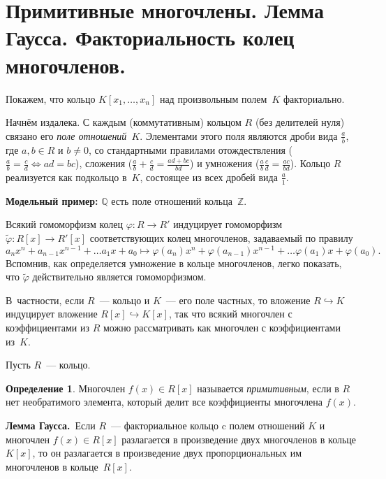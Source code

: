 \documentclass[a4paper, 12pt]{article}
\def\ZZ{{\mathbb Z}}%
\def\QQ{{\mathbb Q}}%
\theoremstyle{definition}
\newtheorem{definition}{Определение}
\theoremstyle{remark}
\begin{document}
\section*{Примитивные многочлены. Лемма Гаусса. Факториальность колец многочленов.}

Покажем, что кольцо $K[x_1, \ldots, x_n]$ над
произвольным полем~$K$ факториально.

Начнём издалека. С каждым (коммутативным) кольцом $R$ (без делителей
нуля) связано его \textit{поле отношений}~$K$. Элементами этого поля
являются дроби вида $\frac{a}{b}$, где $a,b \in R$ и $b\ne 0$, со
стандартными правилами отождествления ($\frac{a}{b} = \frac{c}{d}
\Leftrightarrow ad = bc$), сложения ($\frac{a}{b} + \frac{c}{d} =
\frac{ad+bc}{bd}$) и умножения ($\frac{a}{b}\frac{c}{d} =
\frac{ac}{bd}$). Кольцо $R$ реализуется как подкольцо в~$K$,
состоящее из всех дробей вида $\frac{a}{1}$.

\textbf{Модельный пример:} $\QQ$ есть поле отношений кольца~$\ZZ$.

Всякий гомоморфизм колец $\varphi \colon R \to R'$ индуцирует
гомоморфизм $\widetilde \varphi \colon R[x] \to R'[x]$
соответствующих колец многочленов, задаваемый по правилу
$$
a_n x^n + a_{n-1} x^{n-1} + \ldots a_1 x + a_0 \mapsto \varphi(a_n)
x^n + \varphi(a_{n-1}) x^{n-1} + \ldots \varphi(a_1) x +
\varphi(a_0).
$$
Вспомнив, как определяется умножение в кольце многочленов, легко
показать, что $\widetilde \varphi$ действительно является
гомоморфизмом.

В~частности, если $R$~--- кольцо и $K$~--- его поле частных, то
вложение $R \hookrightarrow K$ индуцирует вложение $R[x]
\hookrightarrow K[x]$, так что всякий многочлен с коэффициентами из
$R$ можно рассматривать как многочлен с коэффициентами из~$K$.


Пусть $R$~--- кольцо.

\begin{definition}
Многочлен $f(x)\in R[x]$ называется {\it примитивным}, если в $R$
нет необратимого элемента, который делит все коэффициенты многочлена
$f(x)$.
\end{definition}

{\bf Лемма Гаусса.}\ Если $R$~--- факториальное кольцо c полем
отношений $K$ и многочлен $f(x) \in R[x]$ разлагается в произведение
двух многочленов в кольце $K[x]$, то он разлагается в произведение
двух пропорциональных им многочленов в кольце~$R[x]$.
\end{document}
